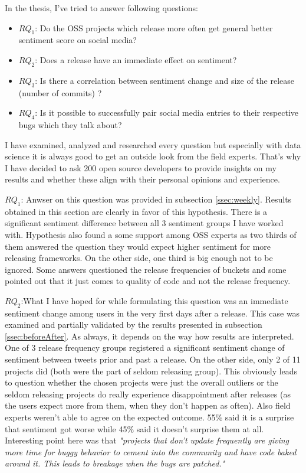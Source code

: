 
In the thesis, I've tried to answer following questions:
\begin{itemize}
\item{\textbf{$RQ_{1}$}: Do the OSS projects which release more often get general better sentiment score on social media?}
\item{\textbf{$RQ_{2}$}: Does a release have an immediate effect on sentiment?}
\item{\textbf{$RQ_{3}$}: Is there a correlation between sentiment change and size of the release (number of commits) ?}
\item{\textbf{$RQ_{4}$}: Is it possible to successfully pair social media entries to their respective bugs which they talk about?}
\end{itemize}

I have examined, analyzed and researched every question but especially with data science it is always good to get an outside look from the field experts. That's why I have decided to ask 200 open source developers to provide insights on my results and whether these align with their personal opinions and experience.

\textbf{$RQ_{1}$}: Anwser on this question was provided in subsection  \ref{ssec:weekly}. Results obtained in this section are clearly in favor of this hypothesis. There is a significant sentiment difference between all 3 sentiment groups I have worked with. Hypothesis also found a some support among OSS experts as two thirds of them answered the question they would expect higher sentiment for more releasing frameworks. On the other side, one third is big enough not to be ignored. Some answers questioned the release frequencies of buckets and some pointed out that it just comes to quality of code and not the release frequency.

\textbf{$RQ_{2}$}:What I have hoped for while formulating this question was an immediate sentiment change among users in the very first days after a release. This case was examined and partially validated by the results presented in subsection \ref{ssec:beforeAfter}. As always, it depends on the way how results are interpreted. One of 3 release frequency groups registered a significant sentiment change of sentiment between tweets prior and past a release. On the other side, only 2 of 11 projects did (both were the part of seldom releasing group). This obviously leads to question whether the chosen projects were just the overall outliers or the seldom releasing projects do really experience disappointment after releases (as the users expect more from them, when they don't happen as often). Also field experts weren't able to agree on the expected outcome. 55\% said  it is a surprise that sentiment got worse while 45\% said it doesn't surprise them at all. Interesting point here was that \textit{"projects that don't update frequently are giving more time for buggy behavior to cement into the community and have code baked around it. This leads to breakage when the bugs are patched."}

